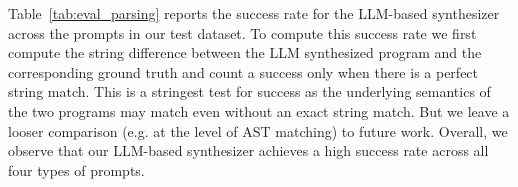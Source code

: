     
    
    



\vspace{0.5em}
Table~\ref{tab:eval_parsing} reports the success rate for the
LLM-based \dslname{} synthesizer across the prompts in our test dataset.
To compute this success rate we first compute the string difference between the
LLM synthesized program and the corresponding ground truth and count a success only
when there is a perfect string match.
%
This is a stringest test for success as the underlying semantics of
the two programs may match even without an exact string match. But we
leave a looser comparison (e.g. at the level of AST matching) to
future work.
%
Overall, we observe that our LLM-based synthesizer achieves a high
success rate across all four types of prompts.  


